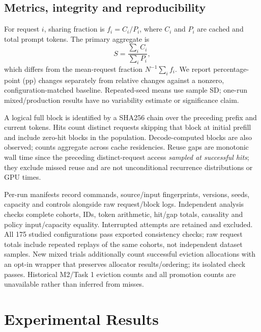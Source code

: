 \documentclass{article}
\begin{document}
\subsection{Metrics, integrity and reproducibility}
For request $i$, sharing fraction is $f_i=C_i/P_i$, where $C_i$ and $P_i$ are cached and total prompt tokens. The primary aggregate is
\begin{equation}
S=\frac{\sum_i C_i}{\sum_i P_i},
\end{equation}
which differs from the mean-request fraction $N^{-1}\sum_i f_i$. We report percentage-point (pp) changes separately from relative changes against a nonzero, configuration-matched baseline. Repeated-seed means use sample SD; one-run mixed/production results have no variability estimate or significance claim.

A logical full block is identified by a SHA256 chain over the preceding prefix and current tokens. Hits count distinct requests skipping that block at initial prefill and include zero-hit blocks in the population. Decode-computed blocks are also observed; counts aggregate across cache residencies. Reuse gaps are monotonic wall time since the preceding distinct-request access \emph{sampled at successful hits}; they exclude missed reuse and are not unconditional recurrence distributions or GPU times.

Per-run manifests record commands, source/input fingerprints, versions, seeds, capacity and controls alongside raw request/block logs. Independent analysis checks complete cohorts, IDs, token arithmetic, hit/gap totals, causality and policy input/capacity equality. Interrupted attempts are retained and excluded. All 175 studied configurations pass exported consistency checks; raw request totals include repeated replays of the same cohorts, not independent dataset samples. New mixed trials additionally count successful eviction allocations with an opt-in wrapper that preserves allocator results/ordering; its isolated check passes. Historical M2/Task 1 eviction counts and all promotion counts are unavailable rather than inferred from misses.

\section{Experimental Results}
\end{document}

